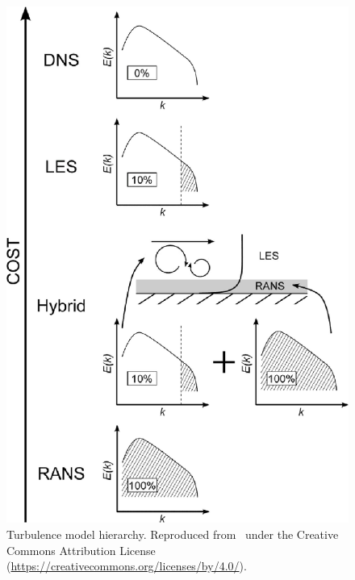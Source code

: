 \documentclass{ucb}
\begin{document}
\begin{figure}[h]
    \centering
    \includegraphics[]{img/TurbulenceModelsResolution_Tucker2015.jpg}
    \caption{Turbulence model hierarchy. Reproduced from~\cite{Tucker2015} under the Creative Commons Attribution License (\url{https://creativecommons.org/licenses/by/4.0/}).}
    \label{fig:HRLMS}
\end{figure}
\end{document}
